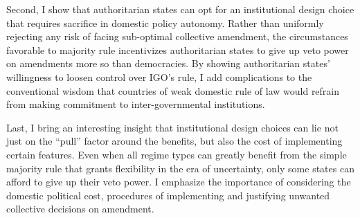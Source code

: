 \documentclass[12pt]{article}
\begin{document}
Second, I show that authoritarian states can opt for an institutional design choice that requires sacrifice in domestic policy autonomy. Rather than uniformly rejecting any risk of facing sub-optimal collective amendment, the circumstances favorable to majority rule incentivizes authoritarian states to give up veto power on amendments more so than democracies. By showing authoritarian states’ willingness to loosen control over IGO’s rule, I add complications to the conventional wisdom that countries of weak domestic rule of law would refrain from making commitment to inter-governmental institutions. 

Last, I bring an interesting insight that institutional design choices can lie not just on the “pull” factor around the benefits, but also the cost of implementing certain features. Even when all regime types can greatly benefit from the simple majority rule that grants flexibility in the era of uncertainty, only some states can afford to give up their veto power. I emphasize the importance of considering the domestic political cost, procedures of implementing and justifying unwanted collective decisions on amendment. 
\end{document}
